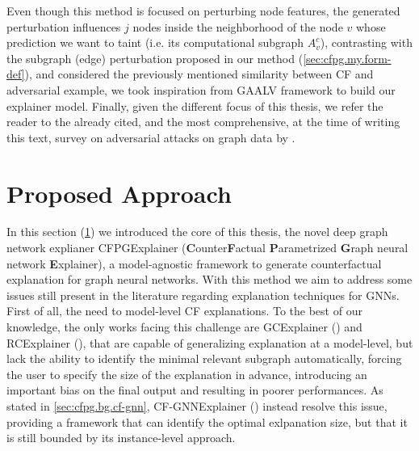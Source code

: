 \documentclass[binding=0.6cm]{sapthesis}
\newcommand{\mycite}[1]{(\cite{#1})}
\begin{document}
Even though this method is focused on perturbing node features, the generated perturbation influences $j$ nodes inside the neighborhood of the node $v$ whose prediction we want to taint (i.e. its computational subgraph $A^c_v$), contrasting with the subgraph (edge) perturbation proposed in our method (\cref{sec:cfpg.my.form-def}), and considered the previously mentioned similarity between CF and adversarial example, we took inspiration from GAALV framework to build our explainer model. 
Finally, given the different focus of this thesis, we refer the reader to the already cited, and the most comprehensive, at the time of writing this text, survey on adversarial attacks on graph data by \cite{sun2023-attack-defense}. 




\newpage
\section{Proposed Approach}
\label{sec:cfpg.my.archs}
In this section (\ref{sec:cfpg.my.archs}) we introduced the core of this thesis, the novel deep graph network explianer CFPGExplainer (\textbf{C}ounter\textbf{F}actual \textbf{P}arametrized \textbf{G}raph neural network \textbf{E}xplainer), a model-agnostic framework to generate counterfactual explanation for graph neural networks. With this method we aim to address some issues still present in the literature regarding explanation techniques for GNNs. First of all, the need to model-level CF explanations. To the best of our knowledge, the only works facing this challenge are GCExplainer \mycite{huang2023-globalCF} and RCExplainer \mycite{bajaj2022-robustCF}, that are capable of generalizing explanation at a model-level, but lack the ability to identify the minimal relevant subgraph automatically, forcing the user to specify the size of the explanation in advance, introducing an important bias on the final output and resulting in poorer performances. As stated in \cref{sec:cfpg.bg.cf-gnn}, CF-GNNExplainer (\cite{lucic2022-cfgnnexplainer}) instead resolve this issue, providing a framework that can identify the optimal exlpanation size, but that it is still bounded by its instance-level approach. 
\end{document}
